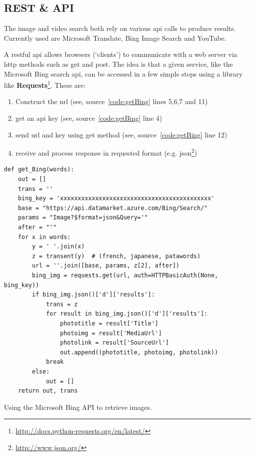 \subsection{REST \& API}

The image and video search both rely on various \gls{api} calls to produce results. Currently used are Microsoft Translate, Bing Image Search and YouTube.

A \acrshort{rest}ful \gls{api} allows browsers (`clients') to communicate with a web server via \acrshort{http} methods such as \gls{get} and \gls{post}. The idea is that a given service, like the Microsoft Bing search \gls{api}, can be accessed in a few simple steps using a library like \textbf{Requests}\footnote{\url{http://docs.python-requests.org/en/latest/}}. These are:

\begin{enumerate}
  \item Construct the \gls{url} (see, source~\ref{code:getBing} lines 5,6,7 and 11)
  \item get an \gls{api} key (see, source~\ref{code:getBing} line 4)
  \item send \gls{url} and key using \gls{get} method (see, source~\ref{code:getBing} line 12)
  \item receive and process response in requested format (e.g. \gls{json}\footnote{\url{http://www.json.org/}})
\end{enumerate}

\begin{listing}
  \begin{verbatim}
def get_Bing(words):
    out = []
    trans = ''
    bing_key = 'xxxxxxxxxxxxxxxxxxxxxxxxxxxxxxxxxxxxxxxxxxx'
    base = "https://api.datamarket.azure.com/Bing/Search/"
    params = "Image?$format=json&Query='"
    after = "'"
    for x in words:
        y = ' '.join(x)
        z = transent(y)  # (french, japanese, patawords)
        url = ''.join([base, params, z[2], after])
        bing_img = requests.get(url, auth=HTTPBasicAuth(None, bing_key))
        if bing_img.json()['d']['results']:
            trans = z
            for result in bing_img.json()['d']['results']:
                phototitle = result['Title']
                photoimg = result['MediaUrl']
                photolink = result['SourceUrl']
                out.append((phototitle, photoimg, photolink))
            break
        else:
            out = []
    return out, trans
  \end{verbatim}
\caption{Using the Microsoft Bing API to retrieve images.}
\label{code:getBing}
\end{listing}

